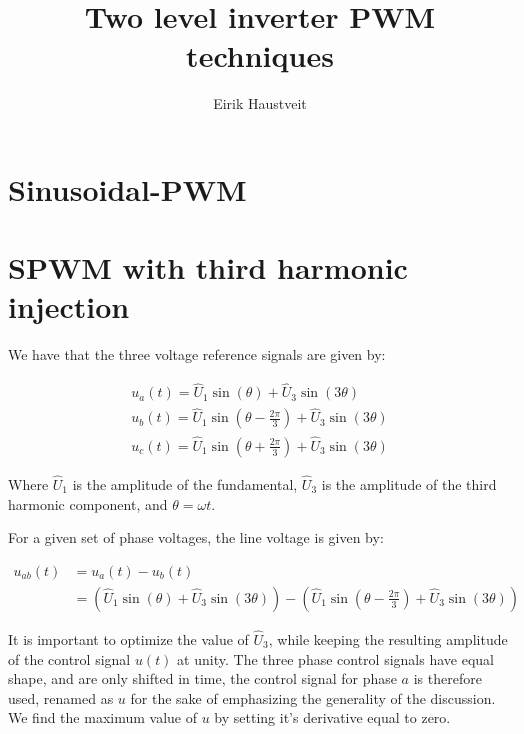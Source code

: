 \documentclass[10pt,a4paper]{article}
\author{Eirik Haustveit}
\title{Two level inverter PWM techniques}
\begin{document}
	
	\maketitle
	
	
	
	\section{Sinusoidal-PWM}
	
	
	\section{SPWM with third harmonic injection}
	
	We have that the three voltage reference signals are given by:
	
	\begin{subequations}
		\begin{align}
			u_a(t) = \hat{U}_1 \sin(\theta) + \hat{U}_3 \sin (3 \theta) \\
			u_b(t) = \hat{U}_1 \sin\left(\theta - \frac{2\pi}{3}\right) + \hat{U}_3 \sin (3 \theta) \\
			u_c(t) = \hat{U}_1 \sin\left(\theta + \frac{2\pi}{3}\right) + \hat{U}_3 \sin (3 \theta)
		\end{align}
	\end{subequations}
	
	
	
	Where $\hat{U}_1$ is the amplitude of the fundamental, $\hat{U}_3$ is the amplitude of the third harmonic component, and $\theta = \omega t$.
	
	For a given set of phase voltages, the line voltage is given by:
	
	\begin{align}
		u_{ab}(t) &= u_a(t) - u_b(t)\\
		&= \left(\hat{U}_1 \sin(\theta) + \hat{U}_3 \sin (3 \theta)\right) - \left(\hat{U}_1 \sin\left(\theta - \frac{2\pi}{3}\right) + \hat{U}_3 \sin (3 \theta) \right)
	\end{align}
	
	
	It is important to optimize the value of $\hat{U}_3$, while keeping the resulting amplitude of the control signal $u(t)$ at unity. The three phase control signals have equal shape, and are only shifted in time, the control signal for phase $a$ is therefore used, renamed as $u$ for the sake of emphasizing the generality of the discussion. We find the maximum value of $u$ by setting it's derivative equal to zero. 
	
\end{document}
